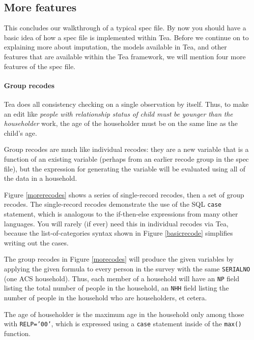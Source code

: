 \documentclass{article}
\begin{document}
\subsection{More features}
This concludes our walkthrough of a typical spec file. By now you should have a basic idea of 
how a spec file is implemented within Tea. Before we continue on to explaining more about imputation, 
the models available in Tea, and other features that are available within the Tea framework, we will mention 
four more features of the spec file.

\paragraph{Group recodes} Tea does all consistency checking on a single observation by
itself. Thus, to make an edit like {\em people with relationship status of child must
be younger than the householder} work, the age of the householder must be on the same line
as the child's age.

Group recodes are much like individual recodes: they are a new variable that is a function
of an existing variable (perhaps from an earlier recode group in the spec file), but the
expression for generating the variable will be evaluated using all of the data in a
household. 

Figure \ref{morerecodes} shows a series of single-record recodes, then a set of group
recodes. The single-record recodes demonstrate the use of the SQL {\tt case} statement,
which is analogous to the if-then-else expressions from many other languages. You will
rarely (if ever) need this in individual recodes via Tea, because the list-of-categories
syntax shown in Figure \ref{basicrecode} simplifies writing out the cases.

The group recodes in Figure \ref{morecodes} will produce the given variables
by applying the given formula to every person in the survey with the same {\tt SERIALNO}
(one ACS household). Thus, each member of a household will have an {\tt NP} field listing
the total number of people in the household, an {\tt NHH} field listing the number of
people in the household who are householders, et cetera. 

The age of householder is the maximum age in the household only among those with {\tt RELP='00'}, which is expressed using 
a {\tt case} statement inside of the {\tt max()} function.
\end{document}
